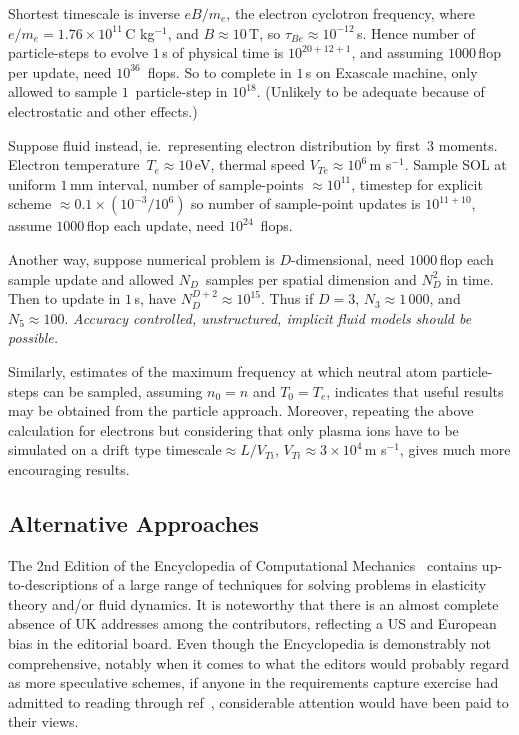 Shortest timescale is inverse $e B/m_e$, the electron cyclotron frequency, where
$e/m_e = 1.76 \times 10^{11}$\,C kg$^{-1}$, and $B\approx 10$\,T, so $\tau_{Be}\approx 10^{-12}$\,s.
Hence number of particle-steps to evolve $1$\,s of physical time is  $10^{20+12+1}$,
and assuming $1000$\,flop per update, need $10^{36}$\, flops.
So to complete in $1$\,s on Exascale machine, only allowed to sample $1$~particle-step in $10^{18}$.
(Unlikely to be adequate because of electrostatic and other effects.)

Suppose fluid instead, ie.\ representing electron distribution by first~$3$ moments.
Electron temperature~$T_e \approx 10$\,eV,
thermal speed $V_{Te}\approx 10^6$\,m s$^{-1}$. Sample SOL at uniform $1$\,mm interval,
number of sample-points $\approx 10^{11}$, timestep for explicit scheme $\approx 0.1 \times (10^{-3} /10^6)$
so number of sample-point updates is $10^{11+10}$, assume  $1000$\,flop each update, need $10^{24}$\, flops.

Another way, suppose numerical problem is $D$-dimensional, need $1000$\,flop each sample update
and allowed $N_D$~samples per spatial dimension and $N_D^2$ in time. Then to update in $1$\,s, have
$N_D^{D+2} \approx 10^{15}$. Thus  if $D=3$, $N_3 \approx 1\,000$, and $N_5 \approx 100$.
\emph{Accuracy controlled, unstructured, implicit fluid models should be possible.}

Similarly, estimates of the maximum frequency at which neutral atom particle-steps can be sampled,
assuming $n_0=n$ and $T_0 =T_e$, indicates that useful results may be obtained from the particle approach.
Moreover, repeating the above calculation for electrons but considering that only plasma ions have
to be simulated on a drift type timescale$\approx L/V_{Ti}$,
$V_{Ti}\approx 3 \times 10^4$\,m s$^{-1}$, gives much more encouraging results.

\subsection{Alternative Approaches}\label{sec:alt}
The 2nd Edition of the Encyclopedia of Computational Mechanics~\cite{encyclcompmech}
contains up-to-descriptions of a large range of techniques for solving problems in
elasticity theory and/or fluid dynamics. It is noteworthy that there is an almost complete
absence of UK addresses among the contributors, reflecting a US and European bias in the editorial
board. Even though the Encyclopedia is demonstrably not comprehensive, notably when it comes to
what the editors would probably regard as more speculative schemes, if anyone in the requirements
capture exercise had admitted to reading through ref~\cite{encyclcompmech},
considerable attention would have been paid to their views. 

